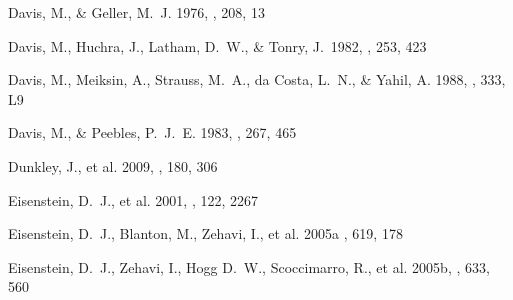 \documentclass[]{emulateapj}
\begin{document}
\begin{thebibliography}{999}

Davis, M., \& Geller, M.\ J. 1976, \apj, 208, 13

Davis, M., Huchra, J., Latham, D.~W., \& Tonry, J.\ 1982, \apj, 253, 423

Davis, M., Meiksin, A., Strauss, M.\ A., da Costa, L.\ N., \& Yahil, A.
1988, \apj, 333, L9

Davis, M., \& Peebles, P.\ J.\ E. 1983, \apj, 267, 465




Dunkley, J., et al. 2009, \apjs, 180, 306


Eisenstein, D.\ J., et al. 2001, \aj, 122, 2267

Eisenstein, D.\ J., Blanton, M., Zehavi, I., et al. 2005a
\apj, 619, 178

Eisenstein, D.\ J., Zehavi, I., Hogg D.\ W., Scoccimarro, R., et al. 2005b,
\apj, 633, 560 %


\end{thebibliography}
\end{document}

